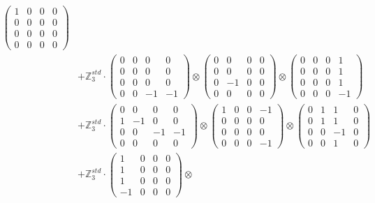 \documentclass{article}
\begin{document}
{\begin{align}
            \begin{pmatrix} 1 & 0 & 0 & 0 \\ 0 & 0 & 0 & 0 \\ 0 & 0 & 0 & 0 \\ 0 & 0 & 0 & 0 \end{pmatrix} \\ 
        &+ \label{Rs1-Rc16-Solution-2-c7} \mathbb{Z}_3^{std} \cdot 
            \begin{pmatrix} 0 & 0 & 0 & 0 \\ 0 & 0 & 0 & 0 \\ 0 & 0 & 0 & 0 \\ 0 & 0 & -1 & -1 \end{pmatrix} \otimes 
            \begin{pmatrix} 0 & 0 & 0 & 0 \\ 0 & 0 & 0 & 0 \\ 0 & -1 & 0 & 0 \\ 0 & 0 & 0 & 0 \end{pmatrix} \otimes 
            \begin{pmatrix} 0 & 0 & 0 & 1 \\ 0 & 0 & 0 & 1 \\ 0 & 0 & 0 & 1 \\ 0 & 0 & 0 & -1 \end{pmatrix} \\ 
        &+ \label{Rs1-Rc16-Solution-2-c8} \mathbb{Z}_3^{std} \cdot 
            \begin{pmatrix} 0 & 0 & 0 & 0 \\ 1 & -1 & 0 & 0 \\ 0 & 0 & -1 & -1 \\ 0 & 0 & 0 & 0 \end{pmatrix} \otimes 
            \begin{pmatrix} 1 & 0 & 0 & -1 \\ 0 & 0 & 0 & 0 \\ 0 & 0 & 0 & 0 \\ 0 & 0 & 0 & -1 \end{pmatrix} \otimes 
            \begin{pmatrix} 0 & 1 & 1 & 0 \\ 0 & 1 & 1 & 0 \\ 0 & 0 & -1 & 0 \\ 0 & 0 & 1 & 0 \end{pmatrix} \\ 
        &+ \label{Rs1-Rc16-Solution-2-c9} \mathbb{Z}_3^{std} \cdot 
            \begin{pmatrix} 1 & 0 & 0 & 0 \\ 1 & 0 & 0 & 0 \\ 1 & 0 & 0 & 0 \\ -1 & 0 & 0 & 0 \end{pmatrix} \otimes 

\end{align}}
\end{document}
